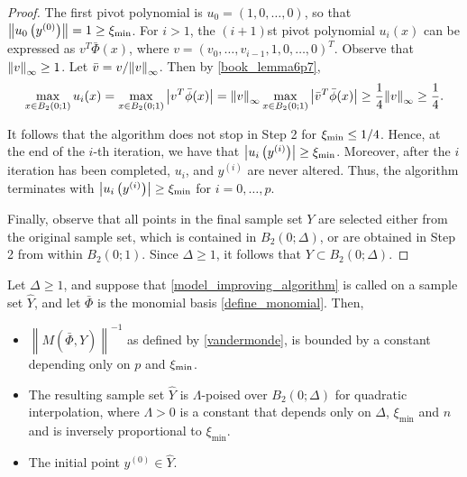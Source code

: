 \begin{proof}

The first pivot polynomial is $u_0 = (1, 0, \ldots, 0)$, so that $\left\|u_0\left(y^{(0)}\right)\right\| = 1 \ge \xi_{\text{min}}$.
For $i > 1$, the $(i+1)$st pivot polynomial $u_i(x)$ can be expressed as $v^T \bar{\Phi}(x)$,
where $v = (v_0, \ldots, v_{i-1},1,0,\ldots,0)^T$.
Observe that ${\left\|v\right\|}_{\infty} \ge 1$.
Let $\bar{v} = v/{\left\|v\right\|}_{\infty}$.
Then by \cref{book_lemma6p7},
\[ \max_{x \in B_2(0;1)} u_i(x) = \max_{x \in B_2(0;1)} \left| v^T \bar{\phi}(x)\right| =
{\left\|v\right\|}_{\infty} \max_{x \in B_2(0;1)}  \left|\bar{v}^T \bar{\phi}(x)\right| \ge \frac{1}{4} {\left\|v\right\|}_{\infty} \ge \frac{1}{4}.\]

It follows that the algorithm does not stop in Step 2 for $\xi_{\text{min}} \le 1/4$.   Hence, at the end of the $i$-th iteration, we have that  $\left| u_i\left(y^{(i)}\right)\right| \ge \xi_{\text{min}}$.  Moreover,  after the $i$ iteration has been completed,  $u_i$,  and $y^{(i)}$ are never altered.  Thus, the algorithm terminates with  $\left| u_i\left(y^{(i)}\right)\right| \ge \xi_{\text{min}}$ for $i=0, \ldots, p$.

Finally,  observe that all points in the final sample set $Y$ are selected either from the original sample set, which is contained in $B_2(0;\Delta)$,  or are obtained in Step 2 from within $B_2(0;1)$.  Since $\Delta  \ge 1$, it follows that $Y \subset B_2(0;\Delta)$.

\end{proof}



\begin{theorem}
\label{set_is_poised}

Let $\Delta \ge 1$, and suppose that \cref{model_improving_algorithm} is called on a sample set $\hat Y$,
and let $\bar{\Phi}$ is the monomial basis \cref{define_monomial}.
Then,
\begin{itemize}
\item $\left\|M(\bar \Phi, \hat Y)\right\|^{-1}$ as defined by \cref{vandermonde}, is bounded by a constant depending only on $p$ and $\xi_{\text{min}}$.
\item The resulting sample set $\hat Y$ is $\Lambda$-poised over $B_2\left(0;\Delta\right)$ for quadratic interpolation,
where $\Lambda > 0$ is a constant that depends only on $\Delta$, $\xi_{\text{min}}$ and $n$ and is inversely proportional to $\xi_{\text{min}}$.
\item The initial point $y^{(0)} \in \hat Y$.
\end{itemize}
\end{theorem}

